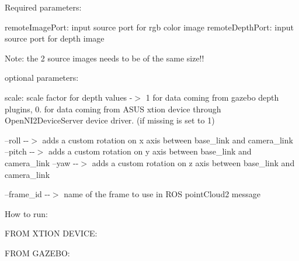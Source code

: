 Required parameters\+:

remote\+Image\+Port\+: input source port for rgb color image remote\+Depth\+Port\+: input source port for depth image

Note\+: the 2 source images needs to be of the same size!!

optional parameters\+:

scale\+: scale factor for depth values -\/$>$ 1 for data coming from gazebo depth plugins, 0. for data coming from ASUS xtion device through Open\+NI2\+Device\+Server device driver. (if missing is set to 1)

--roll -\/-\/$>$ adds a custom rotation on x axis between base\+\_\+link and camera\+\_\+link --pitch -\/-\/$>$ adds a custom rotation on y axis between base\+\_\+link and camera\+\_\+link --yaw -\/-\/$>$ adds a custom rotation on z axis between base\+\_\+link and camera\+\_\+link

--frame\+\_\+id -\/-\/$>$ name of the frame to use in ROS point\+Cloud2 message

How to run\+:

FROM XTION DEVICE\+: 
\begin{DoxyCode}{0}

\end{DoxyCode}


FROM GAZEBO\+: 
\begin{DoxyCode}{0}

\end{DoxyCode}
 